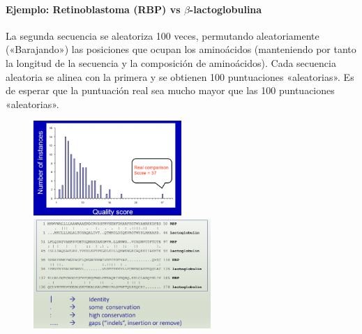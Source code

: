 \paragraph{Ejemplo: Retinoblastoma (RBP) vs $\beta$-lactoglobulina}
La segunda secuencia se aleatoriza 100 veces, permutando aleatoriamente («Barajando») las posiciones que ocupan los aminoácidos (manteniendo por tanto la longitud de la secuencia y la composición de aminoácidos). Cada secuencia aleatoria se alinea con la primera y se obtienen 100 puntuaciones «aleatorias». Es de esperar que la puntuación real sea mucho mayor que las 100 puntuaciones «aleatorias».
\begin{figure}[h]
\centering
\includegraphics[width = 0.5\textwidth]{figs/shuffling.png}
\includegraphics[width = 0.6\textwidth]{figs/alignment-ex.png}
\end{figure}

